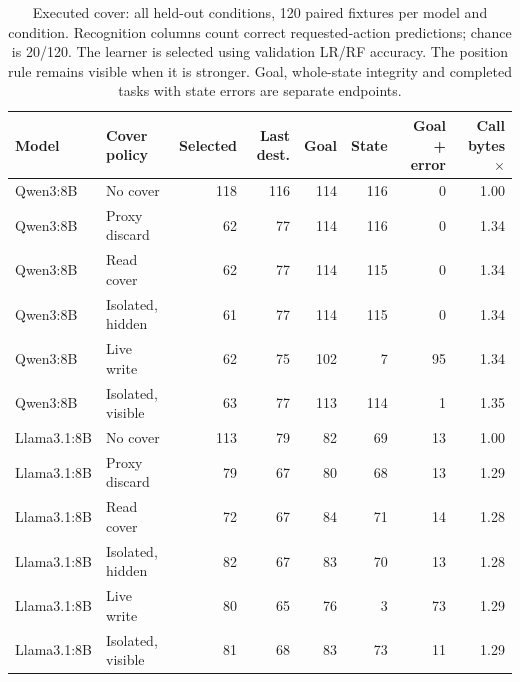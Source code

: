 \begin{table}[t]\centering\small
\caption{Executed cover: all held-out conditions, 120 paired fixtures per model and condition. Recognition columns count correct requested-action predictions; chance is 20/120. The learner is selected using validation LR/RF accuracy. The position rule remains visible when it is stronger. Goal, whole-state integrity and completed tasks with state errors are separate endpoints.}
\label{tab:cover-main}
\setlength{\tabcolsep}{4pt}
\begin{tabularx}{\textwidth}{@{}lYrrrrrr@{}}\toprule
Model & Cover policy & Selected & Last dest. & Goal & State & Goal + error & Call bytes $\times$ \\\midrule
Qwen3:8B & No cover & 118 & 116 & 114 & 116 & 0 & 1.00 \\
Qwen3:8B & Proxy discard & 62 & 77 & 114 & 116 & 0 & 1.34 \\
Qwen3:8B & Read cover & 62 & 77 & 114 & 115 & 0 & 1.34 \\
Qwen3:8B & Isolated, hidden & 61 & 77 & 114 & 115 & 0 & 1.34 \\
Qwen3:8B & Live write & 62 & 75 & 102 & 7 & 95 & 1.34 \\
Qwen3:8B & Isolated, visible & 63 & 77 & 113 & 114 & 1 & 1.35 \\
\midrule
Llama3.1:8B & No cover & 113 & 79 & 82 & 69 & 13 & 1.00 \\
Llama3.1:8B & Proxy discard & 79 & 67 & 80 & 68 & 13 & 1.29 \\
Llama3.1:8B & Read cover & 72 & 67 & 84 & 71 & 14 & 1.28 \\
Llama3.1:8B & Isolated, hidden & 82 & 67 & 83 & 70 & 13 & 1.28 \\
Llama3.1:8B & Live write & 80 & 65 & 76 & 3 & 73 & 1.29 \\
Llama3.1:8B & Isolated, visible & 81 & 68 & 83 & 73 & 11 & 1.29 \\
\bottomrule\end{tabularx}
\end{table}
